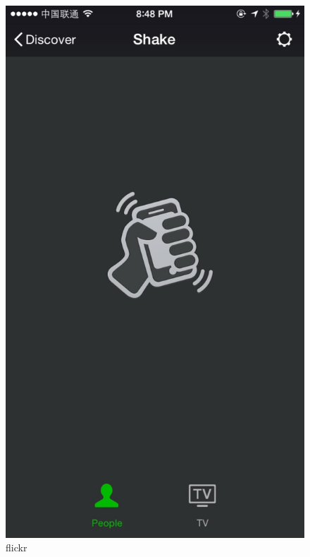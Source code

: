 \begin{figure}[h] 
\begin{minipage}[t]{0.3\linewidth}
\centering
\includegraphics[width=\textwidth]{img/chap1/shake.jpg}
\caption{flickr \label{flickr}}
\end{minipage}
\hfill
\begin{minipage}[t]{0.3\linewidth}
\centering

\end{minipage}
\end{figure}

